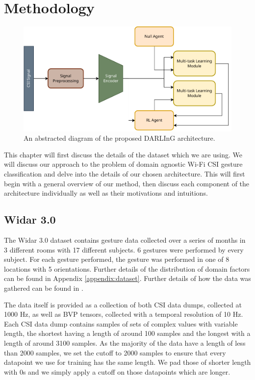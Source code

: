 \chapter{Methodology}\label{chapter:methodology}

\begin{figure}
	\centering
	\includegraphics[width=\linewidth]{figures/arch_diagram.pdf}
	\caption{An abstracted diagram of the proposed DARLInG architecture.}
	\label{fig:arch-diagram}
\end{figure}

This chapter will first discuss the details of the dataset which we are using. 
We will discuss our approach to the problem of domain agnostic Wi-Fi CSI gesture classification and delve into the details of our chosen architecture.
This will first begin with a general overview of our method, then discuss each component of the architecture individually as well as their motivations and intuitions.

\section{Widar 3.0}

The Widar 3.0 dataset \cite{zheng2019zero} contains gesture data collected over a series of months in 3 different rooms with 17 different subjects.
6 gestures were performed by every subject.
For each gesture performed, the gesture was performed in one of 8 locations with 5 orientations.
Further details of the distribution of domain factors can be found in Appendix \ref{appendix:dataset}.
Further details of how the data was gathered can be found in \cite{zheng2019zero}.

The data itself is provided as a collection of both CSI data dumps, collected at 1000 Hz, as well as BVP tensors, collected with a temporal resolution of 10 Hz.
Each CSI data dump contains samples of sets of complex values with variable length, the shortest having a length of around 100 samples and the longest with a length of around 3100 samples. 
As the majority of the data have a length of less than 2000 samples, we set the cutoff to 2000 samples to ensure that every datapoint we use for training has the same length. 
We pad those of shorter length with 0s and we simply apply a cutoff on those datapoints which are longer.

